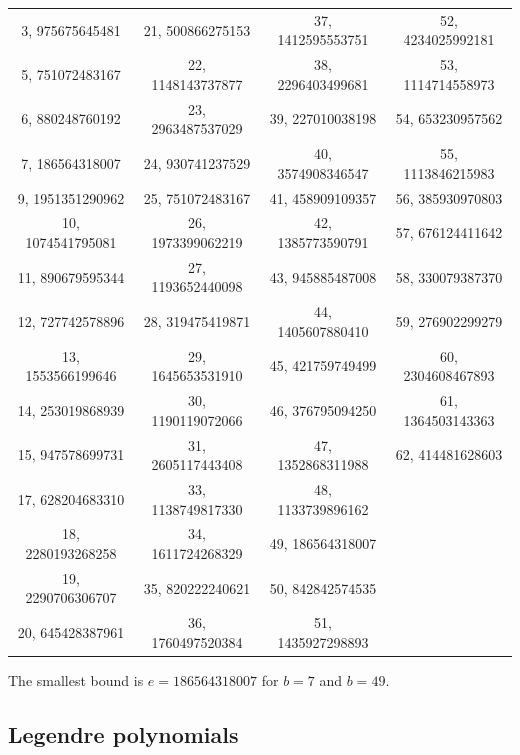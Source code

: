 \documentclass[12pt]{amsart}
\begin{document}
\begin{center}
\begin{tabular}{cccc}
3,  975675645481  & 21, 500866275153  & 37, 1412595553751 & 52, 4234025992181\\
5,  751072483167  & 22, 1148143737877 & 38, 2296403499681 & 53, 1114714558973\\
6,  880248760192  & 23, 2963487537029 & 39, 227010038198  & 54, 653230957562 \\
7,  186564318007  & 24, 930741237529  & 40, 3574908346547 & 55, 1113846215983\\
9,  1951351290962 & 25, 751072483167  & 41, 458909109357  & 56, 385930970803 \\
10, 1074541795081 & 26, 1973399062219 & 42, 1385773590791 & 57, 676124411642 \\
11, 890679595344  & 27, 1193652440098 & 43, 945885487008  & 58, 330079387370 \\
12, 727742578896  & 28, 319475419871  & 44, 1405607880410 & 59, 276902299279 \\
13, 1553566199646 & 29, 1645653531910 & 45, 421759749499  & 60, 2304608467893\\
14, 253019868939  & 30, 1190119072066 & 46, 376795094250  & 61, 1364503143363\\
15, 947578699731  & 31, 2605117443408 & 47, 1352868311988 & 62, 414481628603 \\
17, 628204683310  & 33, 1138749817330 & 48, 1133739896162 \\
18, 2280193268258 & 34, 1611724268329 & 49, 186564318007  \\
19, 2290706306707 & 35, 820222240621  & 50, 842842574535  \\
20, 645428387961  & 36, 1760497520384 & 51, 1435927298893 \\
\end{tabular}
\end{center}
The smallest bound is $e=186564318007$ for $b=7$ and $b=49$.

\subsection{Legendre polynomials}
\label{subsec:legendre-polynomials}
\end{document}
